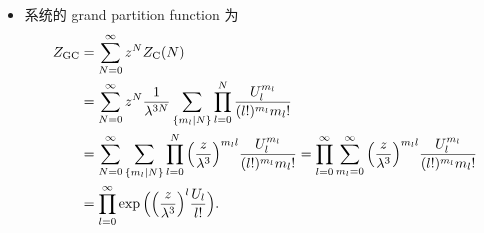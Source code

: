 \begin{itemize}
	\item 系统的 grand partition function 为
	\begin{align}
		Z_\text{GC} &= \sum_{N = 0}^\infty z^N Z_\text{C}(N) \notag \\
		&= \sum_{N = 0}^\infty z^N \frac{1}{\lambda^{3 N}} \sum_{\{m_l | N\}} \prod_{l = 0}^N \frac{U_l^{m_l}}{(l!)^{m_l} m_l!} \notag \\
		&= \sum_{N = 0}^\infty \sum_{\{m_l | N\}} \prod_{l = 0}^N \Big( \frac{z}{\lambda^3} \Big)^{m_l l} \frac{U_l^{m_l}}{(l!)^{m_l} m_l!} = \prod_{l = 0}^\infty \sum_{m_l = 0}^\infty \Big( \frac{z}{\lambda^3} \Big)^{m_l l} \frac{U_l^{m_l}}{(l!)^{m_l} m_l!} \notag \\
		&= \prod_{l = 0}^\infty \exp \Big( \Big( \frac{z}{\lambda^3} \Big)^l \frac{U_l}{l!} \Big).
	\end{align}
\end{itemize}
